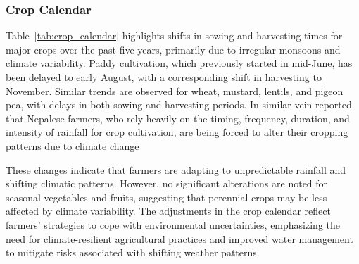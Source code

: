 \subsubsection{Crop Calendar}
Table~\ref{tab:crop_calendar} highlights shifts in sowing and harvesting times for major crops over the past five years, primarily due to irregular monsoons and climate variability. Paddy cultivation, which previously started in mid-June, has been delayed to early August, with a corresponding shift in harvesting to November. Similar trends are observed for wheat, mustard, lentils, and pigeon pea, with delays in both sowing and harvesting periods. In similar vein \citet{bhattaraiImpactClimateChange2021} reported that Nepalese farmers, who rely heavily on the timing, frequency, duration, and intensity of rainfall for crop cultivation, are being forced to alter their cropping patterns due to climate change

These changes indicate that farmers are adapting to unpredictable rainfall and shifting climatic patterns. However, no significant alterations are noted for seasonal vegetables and fruits, suggesting that perennial crops may be less affected by climate variability. The adjustments in the crop calendar reflect farmers' strategies to cope with environmental uncertainties, emphasizing the need for climate-resilient agricultural practices and improved water management to mitigate risks associated with shifting weather patterns.



